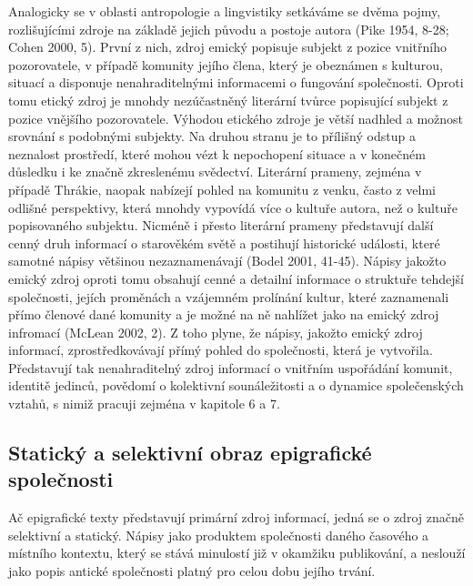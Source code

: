 Analogicky se v oblasti antropologie a lingvistiky setkáváme se dvěma pojmy, rozlišujícími zdroje na základě jejich původu a postoje autora (Pike 1954, 8-28; Cohen 2000, 5). První z nich, zdroj emický popisuje subjekt z pozice vnitřního pozorovatele, v případě komunity jejího člena, který je obeznámen s kulturou, situací a disponuje nenahraditelnými informacemi o fungování společnosti. Oproti tomu etický zdroj je mnohdy nezúčastněný literární tvůrce popisující subjekt z pozice vnějšího pozorovatele. Výhodou etického zdroje je větší nadhled a možnost srovnání s podobnými subjekty. Na druhou stranu je to přílišný odstup a neznalost prostředí, které mohou vézt k nepochopení situace a v konečném důsledku i ke značně zkreslenému svědectví. Literární prameny, zejména v případě Thrákie, naopak nabízejí pohled na komunitu z venku, často z velmi odlišné perspektivy, která mnohdy vypovídá více o kultuře autora, než o kultuře popisovaného subjektu. Nicméně i přesto literární prameny představují další cenný druh informací o starověkém světě a postihují historické události, které samotné nápisy většinou nezaznamenávají (Bodel 2001, 41-45). Nápisy jakožto emický zdroj oproti tomu obsahují cenné a detailní informace o struktuře tehdejší společnosti, jejích proměnách a vzájemném prolínání kultur, které zaznamenali přímo členové dané komunity a je možné na ně nahlížet jako na emický zdroj infromací (McLean 2002, 2). Z toho plyne, že nápisy, jakožto emický zdroj informací, zprostředkovávají přímý pohled do společnosti, která je vytvořila. Představují tak nenahraditelný zdroj informací o vnitřním uspořádání komunit, identitě jedinců, povědomí o kolektivní sounáležitosti a o dynamice společenských vztahů, s nimiž pracuji zejména v kapitole 6 a 7.

\subsection[statický-a-selektivní-obraz-epigrafické-společnosti]{Statický a selektivní obraz epigrafické společnosti}

Ač epigrafické texty představují primární zdroj informací, jedná se o zdroj značně selektivní a statický. Nápisy jako produktem společnosti daného časového a místního kontextu, který se stává minulostí již v okamžiku publikování, a neslouží jako popis antické společnosti platný pro celou dobu jejího trvání.


